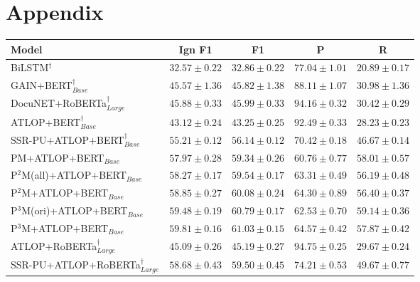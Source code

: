 \documentclass[11pt]{article}
\begin{document}



\appendix

\section{Appendix}
\label{sec:appendix}

\begin{table}%
\centering
\small
\begin{tabular}{lcccc}
\toprule \textbf{Model} & Ign F1 & F1 & P & R \\
\midrule BiLSTM$^{\dagger}$ & $32.57 \pm 0.22$ & $32.86 \pm 0.22$ & $77.04 \pm 1.01$ & $20.89 \pm 0.17$ \\
GAIN+BERT$_{Base}^{\dagger}$ & $45.57 \pm 1.36$ & $45.82 \pm 1.38$ & $88.11 \pm 1.07$ & $30.98 \pm 1.36$ \\
DocuNET+RoBERTa$_{Large}^{\dagger}$ & $45.88 \pm 0.33$ & $45.99 \pm 0.33$ & $94.16 \pm 0.32$ & $30.42 \pm 0.29$ \\
\midrule
ATLOP+BERT$_{Base}^{\dagger}$ & $43.12 \pm 0.24$ & $43.25 \pm 0.25$ & $\mathbf{92.49} \pm \mathbf{0.33}$ & $28.23 \pm 0.23$ \\
SSR-PU+ATLOP+BERT$_{Base}^{\dagger}$ & $55.21 \pm 0.12$ & $56.14 \pm 0.12$ & $70.42 \pm 0.18$ & $46.67 \pm 0.14$ \\
PM+ATLOP+BERT$_{Base}$ & $57.97 \pm 0.28$ & $59.34 \pm 0.26$ & $60.76 \pm 0.77$ & $58.01 \pm 0.57$ \\
P$^{2}$M(all)+ATLOP+BERT$_{Base}$ & $58.27 \pm 0.17$ & $59.54 \pm 0.17$ & $63.31 \pm 0.49$ & $56.19 \pm 0.48$ \\
P$^{2}$M+ATLOP+BERT$_{Base}$ & $58.85 \pm 0.27$ & $60.08 \pm 0.24$ & $64.30 \pm 0.89$ & $56.40 \pm 0.37$ \\
P$^{3}$M(ori)+ATLOP+BERT$_{Base}$ & $59.48 \pm 0.19$ & $60.79 \pm 0.17$ & $62.53 \pm 0.70$ & $\mathbf{59.14} \pm \mathbf{0.36}$ \\
P$^{3}$M+ATLOP+BERT$_{Base}$ & $\mathbf{59.81} \pm \mathbf{0.16}$ & $\mathbf{61.03} \pm \mathbf{0.15}$ & $64.57 \pm 0.42$ & $57.87 \pm 0.42$ \\
\midrule
ATLOP+RoBERTa$_{Large}^{\dagger}$ & $45.09 \pm 0.26$ & $45.19 \pm 0.27$ & $\mathbf{94.75} \pm \mathbf{0.25}$ & $29.67 \pm 0.24$ \\
SSR-PU+ATLOP+RoBERTa$_{Large}^{\dagger}$ & $58.68 \pm 0.43$ & $59.50 \pm 0.45$ & $74.21 \pm 0.53$ & $49.67 \pm 0.77$ \\

\end{tabular}
\end{table}
\end{document}
